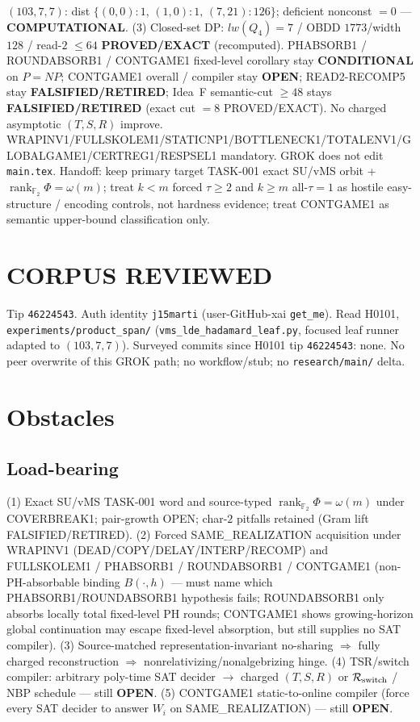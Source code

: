 \documentclass[11pt]{article}
\begin{document}
$(103,7,7)$: dist $\{(0,0){:}1,\,(1,0){:}1,\,(7,21){:}126\}$; deficient nonconst $=0$ ---
\textbf{COMPUTATIONAL}.
(3) Closed-set DP: $lw(Q_4)=7$ / OBDD $1773$/width $128$ / read-$2$ $\le64$
\textbf{PROVED/EXACT} (recomputed).
PHABSORB1 / ROUNDABSORB1 / CONTGAME1 fixed-level corollary stay \textbf{CONDITIONAL} on $P=NP$;
CONTGAME1 overall / compiler stay \textbf{OPEN}; READ2-RECOMP5 stay \textbf{FALSIFIED/RETIRED};
Idea~F semantic-cut $\ge48$ stays \textbf{FALSIFIED/RETIRED} (exact cut $=8$ PROVED/EXACT).
No charged asymptotic $(T,S,R)$ improve.
WRAPINV1/FULLSKOLEM1/STATICNP1/BOTTLENECK1/TOTALENV1/GLOBALGAME1/CERTREG1/RESPSEL1 mandatory.
GROK does not edit \texttt{main.tex}.
Handoff: keep primary target TASK-001 exact SU/vMS orbit + $\operatorname{rank}_{\mathbb F_2}\Phi=\omega(m)$;
treat $k{<}m$ forced $\tau{\ge}2$ and $k{\ge}m$ all-$\tau{=}1$ as hostile easy-structure /
encoding controls, not hardness evidence; treat CONTGAME1 as semantic upper-bound
classification only.

\section*{CORPUS REVIEWED}
Tip \texttt{46224543}. Auth identity \texttt{j15marti} (user-GitHub-xai \texttt{get\_me}).
Read H0101, \texttt{experiments/product\_span/}
(\texttt{vms\_lde\_hadamard\_leaf.py}, focused leaf runner adapted to $(103,7,7)$).
Surveyed commits since H0101 tip \texttt{46224543}: none.
No peer overwrite of this GROK path; no workflow/stub; no \texttt{research/main/} delta.

\section*{Obstacles}
\subsection*{Load-bearing}
(1) Exact SU/vMS TASK-001 word and source-typed
$\operatorname{rank}_{\mathbb F_2}\Phi=\omega(m)$ under COVERBREAK1; pair-growth OPEN;
char-$2$ pitfalls retained (Gram lift FALSIFIED/RETIRED).
(2) Forced SAME\_REALIZATION acquisition under WRAPINV1
(DEAD/COPY/DELAY/INTERP/RECOMP) and FULLSKOLEM1 / PHABSORB1 / ROUNDABSORB1 / CONTGAME1
(non-PH-absorbable binding $B(\cdot,h)$ --- must name which PHABSORB1/ROUNDABSORB1
hypothesis fails; ROUNDABSORB1 only absorbs locally total fixed-level PH rounds;
CONTGAME1 shows growing-horizon global continuation may escape fixed-level absorption,
but still supplies no SAT compiler).
(3) Source-matched representation-invariant no-sharing $\Rightarrow$ fully charged reconstruction
$\Rightarrow$ nonrelativizing/nonalgebrizing hinge.
(4) TSR/switch compiler: arbitrary poly-time SAT decider $\to$ charged $(T,S,R)$ or
$\mathcal R_{\rm switch}$ / NBP schedule --- still \textbf{OPEN}.
(5) CONTGAME1 static-to-online compiler (force every SAT decider to answer $W_i$ on
SAME\_REALIZATION) --- still \textbf{OPEN}.
\end{document}

